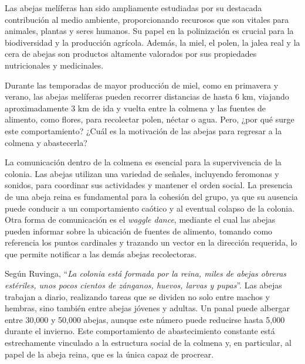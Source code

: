 \documentclass[12pt]{report}
\newenvironment{tightmulticols}{%
  \begin{multicols}{2}
  \setlength{\parskip}{0pt}
  \setlength{\parindent}{0em}
  \linespread{1}\selectfont
}{%
  \end{multicols}
}
\begin{document}
\begin{tightmulticols}
Las abejas melíferas han sido ampliamente estudiadas por su destacada contribución al medio ambiente, proporcionando recurosos que son vitales para animales, plantas y seres humanos. Su papel en la polinización es crucial para la biodiversidad y la producción agrícola\cite{leon2023calidad}. Además, la miel, el polen, la jalea real y la cera de abejas son productos altamente valorados por sus propiedades nutricionales y medicinales\cite{winston1987temperate}.\\
\hspace{2em}
\par Durante las temporadas de mayor producción de miel, como en primavera y verano, las abejas melíferas pueden recorrer distancias de hasta 6 km\cite{Beekman2000}, viajando aproximadamente 3 km de ida y vuelta entre la colmena y las fuentes de alimento, como flores, para recolectar polen, néctar o agua. Pero, ¿por qué surge este comportamiento? ¿Cuál es la motivación de las abejas para regresar a la colmena y abastecerla?
\par La comunicación dentro de la colmena es esencial para la supervivencia de la colonia. Las abejas utilizan una variedad de señales, incluyendo feromonas y sonidos, para coordinar sus actividades y mantener el orden social\cite{winston1987temperate}. La presencia de una abeja reina es fundamental para la cohesión del grupo, ya que su ausencia puede conducir a un comportamiento caótico y al eventual colapso de la colonia\cite{ruvinga2021use}. Otra forma de comunicación es el \textit{waggle dance}, mediante el cual las abejas pueden informar sobre la ubicación de fuentes de alimento, tomando como referencia los puntos cardinales y trazando un vector en la dirección requerida\cite{wang2025encoding}, lo que permite notificar a las demás abejas recolectoras.\\

\par Según Ruvinga\cite{ruvinga2021use}, ``\textit{La colonia está formada por la reina, miles de abejas obreras estériles, unos pocos cientos de zánganos, huevos, larvas y pupas}''. Las abejas trabajan a diario, realizando tareas que se dividen no solo entre machos y hembras, sino también entre abejas jóvenes y adultas\cite{johnson2010division}. Un panal puede albergar entre 30,000 y 50,000 abejas, aunque este número puede reducirse hasta 5,000 durante el invierno. Este comportamiento de abastecimiento constante está estrechamente vinculado a la estructura social de la colmena y, en particular, al papel de la abeja reina, que es la única capaz de procrear\cite{ruvinga2021use}.


\end{tightmulticols}
\end{document}
